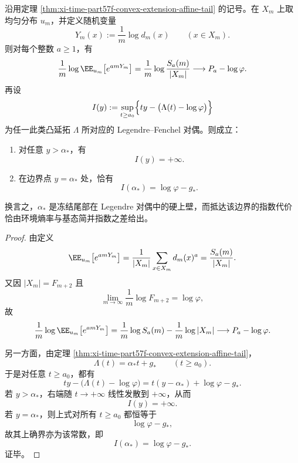 \begin{theorem}\label{thm:xi-time-part57f-legendre-hard-wall-boundary-cost}
沿用定理 \ref{thm:xi-time-part57f-convex-extension-affine-tail} 的记号。在 \(X_m\) 上取均匀分布 \(u_m\)，并定义随机变量
\[
Y_m(x):=\frac{1}{m}\log d_m(x)
\qquad
(x\in X_m).
\]
则对每个整数 \(a\ge 1\)，有
\[
\frac1m\log \EE_{u_m}\!\left[e^{amY_m}\right]
=
\frac1m\log\frac{S_a(m)}{|X_m|}
\longrightarrow
P_a-\log\varphi.
\]
再设
\[
I(y):=
\sup_{t\ge a_0}
\Bigl\{
ty-\bigl(\Lambda(t)-\log\varphi\bigr)
\Bigr\}
\]
为任一此类凸延拓 \(\Lambda\) 所对应的 Legendre--Fenchel 对偶。则成立：
\begin{enumerate}
  \item 对任意 \(y>\alpha_*\)，有
  \[
  \boxed{\;I(y)=+\infty.\;}
  \]
  \item 在边界点 \(y=\alpha_*\) 处，恰有
  \[
  \boxed{\;I(\alpha_*)=\log\varphi-g_*.\;}
  \]
\end{enumerate}
换言之，\(\alpha_*\) 是冻结尾部在 Legendre 对偶中的硬上壁，而抵达该边界的指数代价恰由环境熵率与基态简并指数之差给出。
\end{theorem}
\begin{proof}
由定义
\[
\EE_{u_m}\!\left[e^{amY_m}\right]
=
\frac{1}{|X_m|}
\sum_{x\in X_m} d_m(x)^a
=
\frac{S_a(m)}{|X_m|}.
\]
又因 \(|X_m|=F_{m+2}\) 且
\[
\lim_{m\to\infty}\frac1m\log F_{m+2}=\log\varphi,
\]
故
\[
\frac1m\log \EE_{u_m}\!\left[e^{amY_m}\right]
=
\frac1m\log S_a(m)-\frac1m\log|X_m|
\longrightarrow
P_a-\log\varphi.
\]

另一方面，由定理 \ref{thm:xi-time-part57f-convex-extension-affine-tail}，
\[
\Lambda(t)=\alpha_* t+g_*
\qquad
(t\ge a_0).
\]
于是对任意 \(t\ge a_0\)，都有
\[
ty-\bigl(\Lambda(t)-\log\varphi\bigr)
=
t(y-\alpha_*)+\log\varphi-g_*.
\]
若 \(y>\alpha_*\)，右端随 \(t\to+\infty\) 线性发散到 \(+\infty\)，从而
\[
I(y)=+\infty.
\]
若 \(y=\alpha_*\)，则上式对所有 \(t\ge a_0\) 都恒等于
\[
\log\varphi-g_*,
\]
故其上确界亦为该常数，即
\[
I(\alpha_*)=\log\varphi-g_*.
\]
证毕。
\end{proof}

